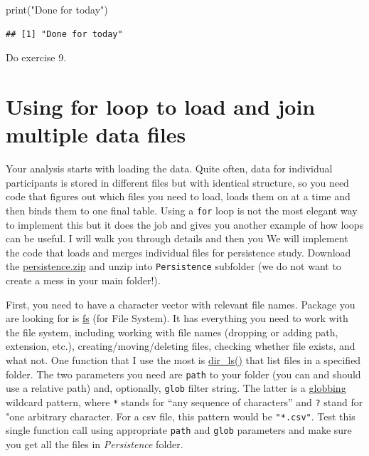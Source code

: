 \documentclass[
]{book}
\newenvironment{Shaded}{\begin{snugshade}}{\end{snugshade}}
\newcommand{\FunctionTok}[1]{\textcolor[rgb]{0.00,0.00,0.00}{#1}}
\newcommand{\NormalTok}[1]{#1}
\newcommand{\StringTok}[1]{\textcolor[rgb]{0.31,0.60,0.02}{#1}}
\begin{document}
\begin{Shaded}
\begin{Highlighting}[]
\FunctionTok{print}\NormalTok{(}\StringTok{"Done for today"}\NormalTok{)}
\end{Highlighting}
\end{Shaded}

\begin{verbatim}
## [1] "Done for today"
\end{verbatim}

Do exercise 9.

\hypertarget{using-for-loop-to-load-and-join-multiple-data-files}{%
\section{Using for loop to load and join multiple data files}\label{using-for-loop-to-load-and-join-multiple-data-files}}

Your analysis starts with loading the data. Quite often, data for individual participants is stored in different files but with identical structure, so you need code that figures out which files you need to load, loads them on at a time and then binds them to one final table. Using a \texttt{for} loop is not the most elegant way to implement this but it does the job and gives you another example of how loops can be useful. I will walk you through details and then you We will implement the code that loads and merges individual files for persistence study. Download the \href{data/persistence.zip}{persistence.zip} and unzip into \texttt{Persistence} subfolder (we do not want to create a mess in your main folder!).

First, you need to have a character vector with relevant file names. Package you are looking for is \href{https://github.com/r-lib/fs}{fs} (for File System). It has everything you need to work with the file system, including working with file names (dropping or adding path, extension, etc.), creating/moving/deleting files, checking whether file exists, and what not. One function that I use the most is \href{https://www.rdocumentation.org/packages/fs/versions/1.5.0/topics/dir_ls}{dir\_ls()} that list files in a specified folder. The two parameters you need are \texttt{path} to your folder (you can and should use a relative path) and, optionally, \texttt{glob} filter string. The latter is a \href{https://en.wikipedia.org/wiki/Glob_(programming)}{globbing} wildcard pattern, where \texttt{*} stands for ``any sequence of characters'' and \texttt{?} stand for "one arbitrary character. For a csv file, this pattern would be \texttt{"*.csv"}. Test this single function call using appropriate \texttt{path} and \texttt{glob} parameters and make sure you get all the files in \emph{Persistence} folder.
\end{document}
